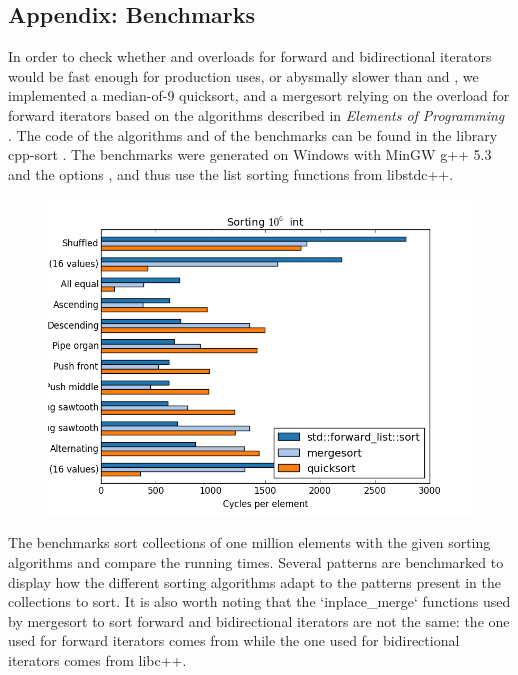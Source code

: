 \documentclass{isocpp_proposal}
\begin{document}
\newpage
\begin{appendices}
\section*{Appendix: Benchmarks} \label{App:Benchmarks}

In order to check whether  and  overloads for forward and bidirectional iterators would be fast enough for production uses, or abysmally slower than  and , we implemented a median-of-9 quicksort, and a mergesort relying on the  overload for forward iterators based on the algorithms described in \emph{Elements of Programming} \cite{EOP}. The code of the algorithms and of the benchmarks can be found in the library cpp-sort \cite{cpp-sort}. The benchmarks were generated on Windows with MinGW g++ 5.3 and the options , and thus use the list sorting functions from libstdc++.

\begin{figure}[h]
\includegraphics[width=\textwidth]{forward-list-int.png}
\end{figure}

\newpage

The benchmarks sort collections of one million elements with the given sorting algorithms and compare the running times. Several patterns are benchmarked to display how the different sorting algorithms adapt to the patterns present in the collections to sort. It is also worth noting that the `inplace\_merge` functions used by mergesort to sort forward and bidirectional iterators are not the same: the one used for forward iterators comes from  while the one used for bidirectional iterators comes from libc++.


\end{appendices}
\end{document}
